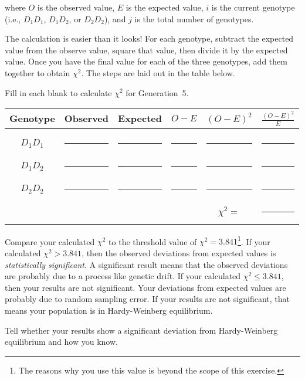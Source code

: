 \documentclass[12pt]{exam}
\begin{document}
\begin{questions}
where $O$ is the observed value, $E$ is the expected value, $i$ is the current 
genotype (i.e., $D_1D_1$, $ D_1D_2$, or $D_2D_2$), and $j$ is the total number 
of genotypes. 

The calculation is easier than it looks! For each genotype, subtract the 
expected value from the observe value, square that value, then divide it 
by the expected value. Once you have the final value for each of the three 
genotypes, add them together to obtain $\chi^2$. The steps are laid out 
in the table below. 

\question[Checkout]
Fill in each blank to calculate $\chi^2$ for Generation~5.

\begin{longtable}{cccccc}
	\toprule
	Genotype & Observed & Expected & $O-E$ & $(O-E)^2$ & $\frac{(O-E)^2}{E}$ \tabularnewline
	\midrule
	&&&&&\tabularnewline
	$D_1D_1$ & \rule{0.5in}{0.4pt} & \rule{0.5in}{0.4pt} & \rule{0.5in}{0.4pt} & \rule{0.5in}{0.4pt} & \rule{0.5in}{0.4pt}\tabularnewline[2em]
	$D_1D_2$ & \rule{0.5in}{0.4pt} & \rule{0.5in}{0.4pt} & \rule{0.5in}{0.4pt} & \rule{0.5in}{0.4pt} & \rule{0.5in}{0.4pt}\tabularnewline[2em]
	$D_2D_2$ & \rule{0.5in}{0.4pt} & \rule{0.5in}{0.4pt} & \rule{0.5in}{0.4pt} & \rule{0.5in}{0.4pt} & \rule{0.5in}{0.4pt}\tabularnewline[2em]
	&&&& $\chi^2 = $& \rule{0.5in}{0.4pt}\tabularnewline
	\bottomrule
\end{longtable}

Compare your calculated $\chi^2$ to the threshold value of $\chi^2 = 3.841$\footnote{The reasons why you use this value is beyond the scope of this exercise.}. If your calculated $\chi^2 > 3.841$, then the observed deviations from expected values is \emph{statistically significant}. A significant result means that the observed deviations are probably due to a process like genetic drift. If your calculated $\chi^2 \le 3.841$, then your results are not significant. Your deviations from expected values are probably due to random sampling error. If your results are not significant, that means your population is in Hardy-Weinberg equilibrium.

\question[Checkout]
Tell whether your results show a significant deviation from Hardy-Weinberg equilibrium and how you know. 


\end{questions}


\newpage
\end{document}
